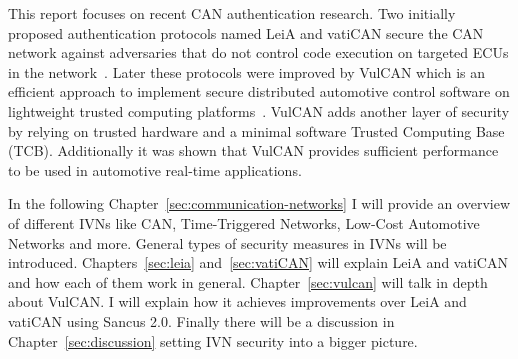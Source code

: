 This report focuses on recent CAN authentication research. Two initially
proposed authentication protocols named LeiA and vatiCAN secure the CAN network
against adversaries that do not control code execution on targeted ECUs in the
network~\cite{Nurnberger2016,Radu2016}. Later these protocols were improved by
VulCAN which is an efficient approach to implement secure distributed automotive
control software on lightweight trusted computing platforms~\cite{VanBulck2017}.
VulCAN adds another layer of security by relying on trusted hardware and a
minimal software Trusted Computing Base (TCB). Additionally it was shown that
VulCAN provides sufficient performance to be used in automotive real-time
applications.

In the following Chapter~\ref{sec:communication-networks} I will provide an
overview of different IVNs like CAN, Time-Triggered Networks, Low-Cost
Automotive Networks and more. General types of security measures in IVNs will be
introduced. Chapters~\ref{sec:leia} and~\ref{sec:vatiCAN} will explain LeiA
and vatiCAN and how each of them work in general. Chapter~\ref{sec:vulcan} will
talk in depth about VulCAN\@. I will explain how it achieves improvements over
LeiA and vatiCAN using Sancus 2.0. Finally there will be a discussion in
Chapter~\ref{sec:discussion} setting IVN security into a bigger picture.
